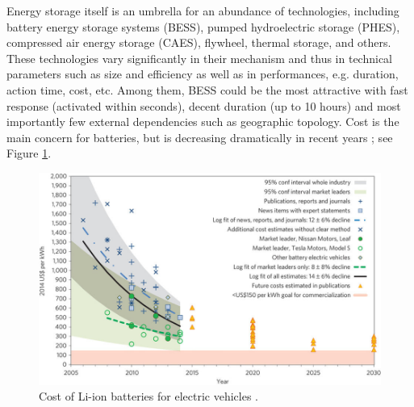 \begin{itemize}
	Energy storage itself is an umbrella for an abundance of technologies, including battery energy storage systems (BESS), pumped hydroelectric storage (PHES), compressed air energy storage (CAES), flywheel, thermal storage, and others. These technologies vary significantly in their mechanism and thus in technical parameters such as size and efficiency as well as in performances, e.g. duration, action time, cost, etc. Among them, BESS could be the most attractive with fast response (activated within seconds), decent duration (up to 10 hours) and most importantly few external dependencies such as geographic topology. Cost is the main concern for batteries, but is decreasing dramatically in recent years \cite{Nykvist2015}; see Figure \ref{fig:BatteryFallingPrice}.
	
	\begin{figure} [h!]
		\centering
		\includegraphics[width=0.95\linewidth]{Figures/BatteryFallingPrice.jpg}
		\caption{Cost of Li-ion batteries for electric vehicles \cite{Nykvist2015}.}
		\label{fig:BatteryFallingPrice}
	\end{figure}
	
	
	

\end{itemize}
